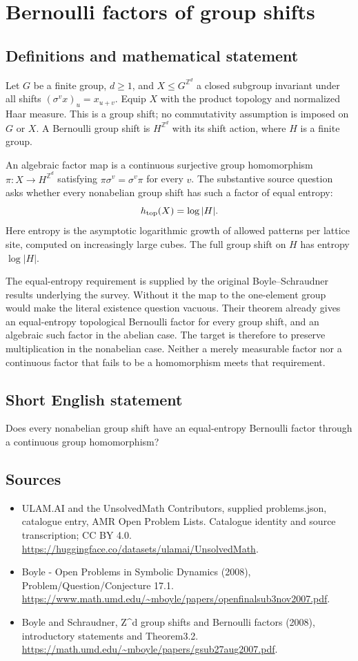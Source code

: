\documentclass[11pt,a4paper]{article}
\begin{document}
\section*{Bernoulli factors of group shifts}\label{statement}

\subsection{Definitions and mathematical statement}
Let $G$ be a finite group, $d\ge1$, and $X\le G^{\mathbb Z^d}$ a closed
subgroup invariant under all shifts $(\sigma^v x)_u=x_{u+v}$. Equip $X$
with the product topology and normalized Haar measure. This is a group
shift; no commutativity assumption is imposed on $G$ or $X$.
A Bernoulli group shift is $H^{\mathbb Z^d}$ with its shift action,
where $H$ is a finite group.

An algebraic factor map is a continuous surjective group homomorphism
$\pi:X\to H^{\mathbb Z^d}$ satisfying
$\pi\sigma^v=\sigma^v\pi$ for every $v$. The substantive source question
asks whether every nonabelian group shift has such a factor of equal
entropy:
\[
 h_{\rm top}(X)=\log|H|.
\]
Here entropy is the asymptotic logarithmic growth of allowed patterns
per lattice site, computed on increasingly large cubes. The full group
shift on $H$ has entropy $\log|H|$.

The equal-entropy requirement is supplied by the original
Boyle–Schraudner results underlying the survey. Without it the map to
the one-element group would make the literal existence question
vacuous. Their theorem already gives an equal-entropy topological
Bernoulli factor for every group shift, and an algebraic such factor
in the abelian case. The target is therefore to preserve multiplication
in the nonabelian case. Neither a merely measurable factor nor a
continuous factor that fails to be a homomorphism meets that requirement.
\subsection{Short English statement}
Does every nonabelian group shift have an equal-entropy Bernoulli factor through a continuous group homomorphism?
\subsection{Sources}
\begin{itemize}
\item[S1] ULAM.AI and the UnsolvedMath Contributors, supplied problems.json, catalogue entry, AMR Open Problem Lists. Catalogue identity and source transcription; CC BY 4.0.
\url{https://huggingface.co/datasets/ulamai/UnsolvedMath}.
\item[S2] Boyle - Open Problems in Symbolic Dynamics (2008), Problem/Question/Conjecture 17.1. 
\url{https://www.math.umd.edu/~mboyle/papers/openfinalsub3nov2007.pdf}.
\item[S3] Boyle and Schraudner, Z\textasciicircum{}d group shifts and Bernoulli factors (2008), introductory statements and Theorem3.2.
\url{https://math.umd.edu/~mboyle/papers/gsub27aug2007.pdf}.
\end{itemize}
\end{document}
